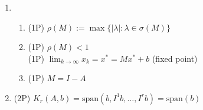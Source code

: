 {\color{solution}
\begin{enumerate}
\item\begin{enumerate}
	\item \textcolor{exampoints}{(1P)}	 $\rho(M) := \max \{|\lambda|: \lambda \in\sigma(M)\}$
	\item \textcolor{exampoints}{(1P)} $\rho(M)<1$\\
		\textcolor{exampoints}{(1P)} $\lim_{k\to\infty}x_k = x^* = Mx^* + b$ (fixed point)
	\item \textcolor{exampoints}{(1P)} $M = I - A$
\end{enumerate}
\item \textcolor{exampoints}{(2P)} $K_r(A,b) = \text{span}(b, I^1b, \ldots, I^r b) =\text{span}(b) $
\end{enumerate}
}
